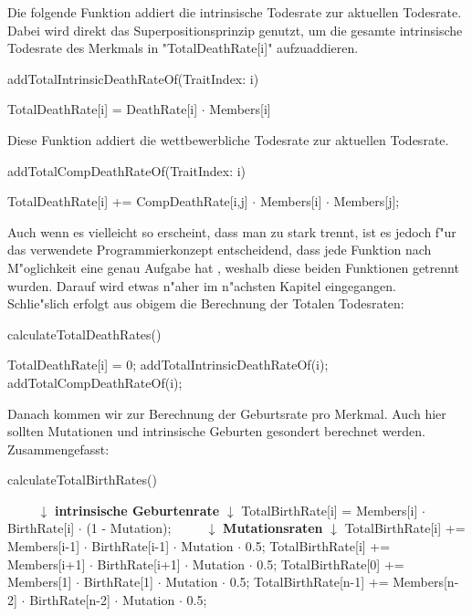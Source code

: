 \documentclass[11pt, a4paper, german]{article}
\theoremstyle{plain}
\begin{document}
	Die folgende Funktion addiert die intrinsische Todesrate zur aktuellen Todesrate. Dabei wird direkt das Superpositionsprinzip genutzt, um die gesamte intrinsische Todesrate des Merkmals in "{}TotalDeathRate[i]"{} aufzuaddieren.
	\begin{algorithm}[H]
		\caption{addTotalIntrinsicDeathRateOf(TraitIndex: i)}
		\begin{algorithmic}[1]
			\State TotalDeathRate[i] = DeathRate[i] $ \cdot $ Members[i]
		\end{algorithmic}
	\end{algorithm}
	Diese Funktion addiert die wettbewerbliche Todesrate zur aktuellen Todesrate.
	\begin{algorithm}[H]
		\caption{addTotalCompDeathRateOf(TraitIndex: i)}
		\begin{algorithmic}[1]
				\State TotalDeathRate[i] += CompDeathRate[i,j] $ \cdot $ Members[i] $ \cdot $ Members[j];
			\EndFor
		\end{algorithmic}
	\end{algorithm}
	Auch wenn es vielleicht so erscheint, dass man zu stark trennt, ist es jedoch f"ur das verwendete Programmierkonzept entscheidend, dass jede Funktion nach M"oglichkeit eine genau Aufgabe hat \cite{martin2008clean}, weshalb diese beiden Funktionen getrennt wurden. Darauf wird etwas n"aher im n"achsten Kapitel eingegangen. \\
	Schlie"slich erfolgt aus obigem die Berechnung der Totalen Todesraten:
	\begin{algorithm}[H]
		\caption{calculateTotalDeathRates()}
		\begin{algorithmic}[1]
				\State TotalDeathRate[i] = 0;
				\State addTotalIntrinsicDeathRateOf(i);
				\State addTotalCompDeathRateOf(i);
			\EndFor
		\end{algorithmic}
	\end{algorithm}
	Danach kommen wir zur Berechnung der Geburtsrate pro Merkmal. Auch hier sollten Mutationen und intrinsische Geburten gesondert berechnet werden. Zusammengefasst:
	\begin{algorithm}[H]
		\caption{calculateTotalBirthRates()}
		\begin{algorithmic}[1]
			\State $ \qquad $ $ \downarrow $ \textbf{intrinsische Geburtenrate} $ \downarrow $
				\State TotalBirthRate[i] = Members[i] $ \cdot $ BirthRate[i] $ \cdot $ (1 - Mutation);
			\EndFor
			\State $ \qquad $ $ \downarrow $ \textbf{Mutationsraten} $ \downarrow $
				\State TotalBirthRate[i] += Members[i-1] $ \cdot $ BirthRate[i-1] $ \cdot $ Mutation $ \cdot $ 0.5;
				\State TotalBirthRate[i] += Members[i+1] $ \cdot $ BirthRate[i+1] $ \cdot $ Mutation $ \cdot $ 0.5;
			\EndFor
			\State TotalBirthRate[0] += Members[1] $ \cdot $ BirthRate[1] $ \cdot $ Mutation $ \cdot $ 0.5;
			\State TotalBirthRate[n-1] += Members[n-2] $ \cdot $ BirthRate[n-2] $ \cdot $ Mutation $ \cdot $ 0.5;
		\end{algorithmic}
	\end{algorithm}
\end{document}
